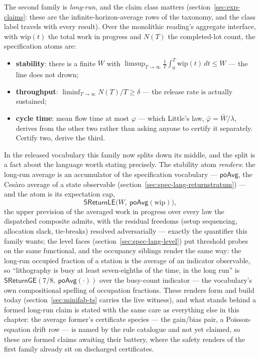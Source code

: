 The second family is \emph{long-run}, and the claim class matters
(section~\ref{sec:exp-claims}: these are the infinite-horizon-average
rows of the taxonomy, and the class label travels with every result). Over
the monolithic reading's aggregate interface, with $\mathrm{wip}(t)$
the total work in progress and $N(T)$ the completed-lot count, the
specification atoms are:
\begin{itemize}
\item \textbf{stability}: there is a finite $W$ with
  $\limsup_{T \to \infty} \frac{1}{T}\int_0^T \mathrm{wip}(t)\,dt
  \le W$ --- the line does not drown;
\item \textbf{throughput}: $\liminf_{T \to \infty} N(T)/T \ge
  \delta$ --- the release rate is actually sustained;
\item \textbf{cycle time}: mean flow time at most $\varphi$ ---
  which Little's law, $\bar\varphi = \bar{W}/\lambda$, derives from
  the other two rather than asking anyone to certify it separately.
  Certify two, derive the third.
\end{itemize}
In the released vocabulary this family now splits down its middle,
and the split is a fact about the language worth stating precisely.
The stability atom \emph{renders}: the long-run average is an
accumulator of the specification vocabulary --- $\mathsf{poAvg}$,
the Ces\`aro average of a state observable
(section~\ref{sec:spec-lang-returnstratum}) --- and the atom is its
expectation cap,
\[
  \mathsf{SReturnLE}\bigl(W,\ \mathsf{poAvg}(\mathrm{wip})\bigr),
\]
the upper prevision of the averaged work in progress over every law
the dispatched composite admits, with the residual freedoms (setup
sequencing, allocation slack, tie-breaks) resolved adversarially
--- exactly the quantifier this family wants; the level faces
(section~\ref{sec:spec-lang-level}) put threshold probes on the
same functional, and the occupancy siblings render the same way:
the long-run occupied fraction of a station is the average of an
indicator observable, so ``lithography is busy at least
seven-eighths of the time, in the long run'' is
$\mathsf{SReturnGE}(7/8,\ \mathsf{poAvg}(\cdot))$ over the
busy-count indicator --- the vocabulary's own compositional
spelling of occupation fractions. These renders form and build
today (section~\ref{sec:minifab-ts} carries the live witness), and
what stands behind a formed long-run claim is stated with the same
care as everything else in this chapter: the average former's
certificate species --- the gain/bias pair, a Poisson-equation
drift row --- is named by the rule catalogue and not yet claimed,
so these are formed claims awaiting their battery, where the
safety renders of the first family already sit on discharged
certificates.


